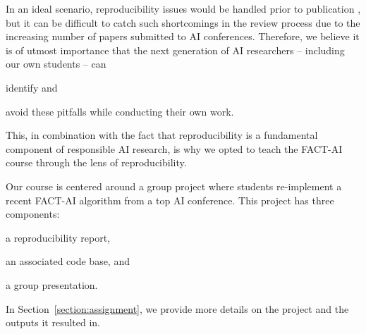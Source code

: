 In an ideal scenario, reproducibility issues would be handled prior to publication \citep{sculley2018winner}, 
but it can be difficult to catch such shortcomings in the review process due to the increasing number of papers submitted to AI conferences. 
Therefore, we believe it is of utmost importance that the next generation of AI researchers -- including our own students -- can 
\begin{enumerate*}[label=(\roman*)]
\item identify and 
\item avoid these pitfalls while conducting their own work. 
\end{enumerate*}
This, in combination with the fact that reproducibility is a fundamental component of responsible AI research, is why we opted to teach the FACT-AI course through the lens of reproducibility. 

Our course is centered around a group project where students re-implement a recent FACT-AI algorithm from a top AI conference. 
This project has three components:
\begin{enumerate*}[label=(\roman*)]
\item a reproducibility report, 
\item an associated code base, and 
\item a group presentation. 
\end{enumerate*}
In Section~\ref{section:assignment}, we provide more details on the project and the outputs it resulted in. 
